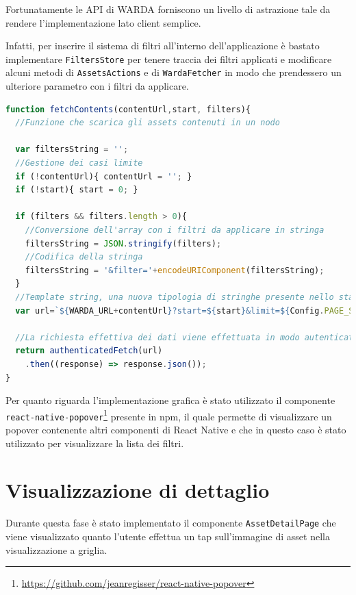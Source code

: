 Fortunatamente le API di WARDA forniscono un livello di astrazione tale da rendere l'implementazione lato client semplice.

Infatti, per inserire il sistema di filtri all'interno dell'applicazione è bastato implementare \texttt{FiltersStore} per tenere traccia dei filtri applicati e modificare alcuni metodi di \texttt{AssetsActions} e di \texttt{WardaFetcher} in modo che prendessero un ulteriore parametro con i filtri da applicare.

\begin{lstlisting}[language=JavaScript, caption=WardaFetcher - Caricamento degli assets considerando i filtri]
function fetchContents(contentUrl,start, filters){
  //Funzione che scarica gli assets contenuti in un nodo

  var filtersString = '';
  //Gestione dei casi limite
  if (!contentUrl){ contentUrl = ''; }
  if (!start){ start = 0; }

  if (filters && filters.length > 0){
    //Conversione dell'array con i filtri da applicare in stringa
    filtersString = JSON.stringify(filters);
    //Codifica della stringa
    filtersString = '&filter='+encodeURIComponent(filtersString);
  }
  //Template string, una nuova tipologia di stringhe presente nello standard ES6 di JavaScript, le variabili presenti all'interno del blocco ${ } vengono sostituite con il loro valore
  var url=`${WARDA_URL+contentUrl}?start=${start}&limit=${Config.PAGE_SIZE}${filtersString}`;

  //La richiesta effettiva dei dati viene effettuata in modo autenticato
  return authenticatedFetch(url)
    .then((response) => response.json());
}
\end{lstlisting}

Per quanto riguarda l'implementazione grafica è stato utilizzato il componente \texttt{react-native-popover}\footnote{\url{https://github.com/jeanregisser/react-native-popover}} presente in npm, il quale permette di visualizzare un popover contenente altri componenti di React Native e che in questo caso è stato utilizzato per visualizzare la lista dei filtri.

\section{Visualizzazione di dettaglio}

Durante questa fase è stato implementato il componente \texttt{AssetDetailPage} che viene visualizzato quanto l'utente effettua un tap sull'immagine di asset nella visualizzazione a griglia. 

